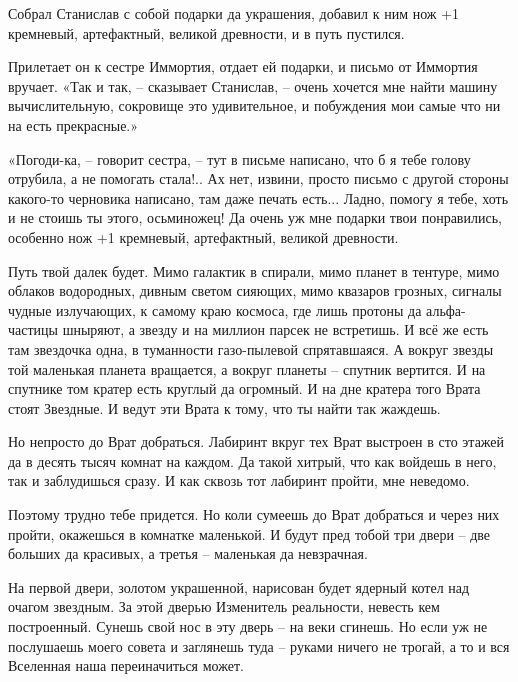 \documentclass[ebook,oneside,final,openright]{memoir}
\begin{document}
\par
Собрал Станислав с собой подарки да украшения, добавил к ним нож +1 кремневый, артефактный, великой древности, и в путь пустился.\par
\par
Прилетает он к сестре Иммортия, отдает ей подарки, и письмо от Иммортия вручает. «Так и так, – сказывает Станислав, – очень хочется мне найти машину вычислительную, сокровище это удивительное, и побуждения мои самые что ни на есть прекрасные.»\par
\par
«Погоди-ка, – говорит сестра, – тут в письме написано, что б я тебе голову отрубила, а не помогать стала!.. Ах нет, извини, просто письмо с другой стороны какого-то черновика написано, там даже печать есть... Ладно, помогу я тебе, хоть и не стоишь ты этого, осьминожец! Да очень уж мне подарки твои понравились, особенно нож +1 кремневый, артефактный, великой древности.\par
\par
Путь твой далек будет. Мимо галактик в спирали, мимо планет в тентуре, мимо облаков водородных, дивным светом сияющих, мимо квазаров грозных, сигналы чудные излучающих, к самому краю космоса, где лишь протоны да альфа-частицы шныряют, а звезду и на миллион парсек не встретишь. И всё же есть там звездочка одна, в туманности газо-пылевой спрятавшаяся. А вокруг звезды той маленькая планета вращается, а вокруг планеты – спутник вертится. И на спутнике том кратер есть круглый да огромный. И на дне кратера того Врата стоят Звездные. И ведут эти Врата к тому, что ты найти так жаждешь.\par
\par
Но непросто до Врат добраться. Лабиринт вкруг тех Врат выстроен в сто этажей да в десять тысяч комнат на каждом. Да такой хитрый, что как войдешь в него, так и заблудишься сразу. И как сквозь тот лабиринт пройти, мне неведомо.\par
\par
Поэтому трудно тебе придется. Но коли сумеешь до Врат добраться и через них пройти, окажешься в комнатке маленькой. И будут пред тобой три двери – две больших да красивых, а третья – маленькая да невзрачная.\par
\par
На первой двери, золотом украшенной, нарисован будет ядерный котел над очагом звездным. За этой дверью Изменитель реальности, невесть кем построенный. Сунешь свой нос в эту дверь – на веки сгинешь. Но если уж не послушаешь моего совета и заглянешь туда – руками ничего не трогай, а то и вся Вселенная наша переиначиться может.\par
\end{document}
